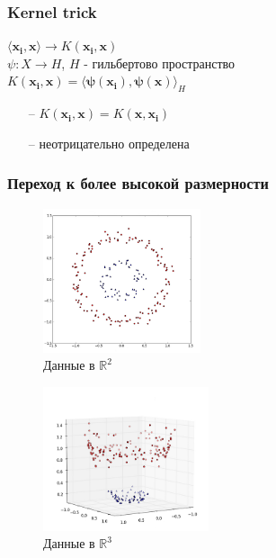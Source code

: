 \documentclass[12pt]{beamer}
\begin{document}
\begin{frame}\frametitle{Kernel trick}
$\langle \mathbf{x_i}, \mathbf{x} \rangle \rightarrow K(\mathbf{x_i}, \mathbf{x})$\\
\vspace{5mm}
$\psi: X \rightarrow H$, $H$ - гильбертово пространство\\
$K(\mathbf{x_i}, \mathbf{x}) = \langle \mathbf{\psi(x_i)}, \mathbf{\psi(x)} \rangle_H$
\begin{itemize}
\item[--] $K(\mathbf{x_i}, \mathbf{x}) = K(\mathbf{x}, \mathbf{x_i})$
\item[--] неотрицательно определена
\end{itemize}
\end{frame}

\begin{frame}\frametitle{Переход к более высокой размерности}
\begin{figure}[htbp]
	\begin{minipage}{.5\textwidth}
	  \includegraphics[height=120pt, keepaspectratio = true]{images/data-r2} \\
		\centering Данные в $\mathbb{R}^2$
    \end{minipage}%
    \begin{minipage}{.5\textwidth}
		\includegraphics[height=120pt, keepaspectratio = true]{images/data-r3}   \\
		\centering Данные в $\mathbb{R}^3$
	\end{minipage}%

\end{figure}
\end{frame}
\end{document}
